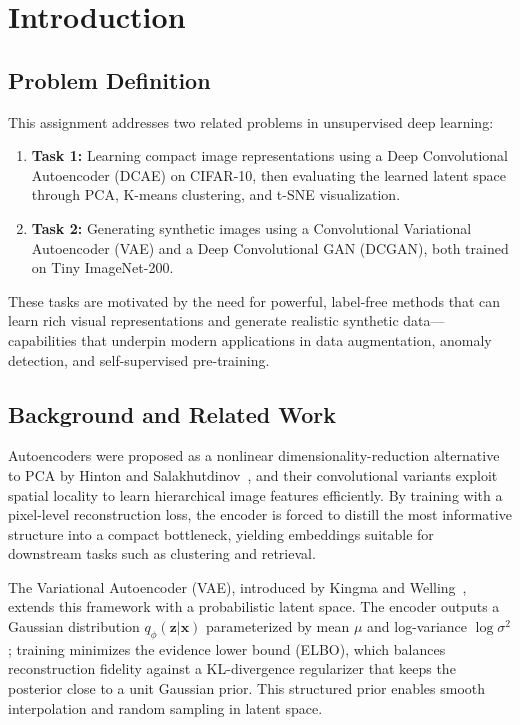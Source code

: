 \documentclass[12pt]{article}
\begin{document}
\section{Introduction}

\subsection{Problem Definition}

This assignment addresses two related problems in unsupervised deep learning:
\begin{enumerate}
    \item \textbf{Task 1:} Learning compact image representations using a Deep Convolutional Autoencoder (DCAE) on CIFAR-10, then evaluating the learned latent space through PCA, K-means clustering, and t-SNE visualization.
    \item \textbf{Task 2:} Generating synthetic images using a Convolutional Variational Autoencoder (VAE) and a Deep Convolutional GAN (DCGAN), both trained on Tiny ImageNet-200.
\end{enumerate}

These tasks are motivated by the need for powerful, label-free methods that can learn rich visual representations and generate realistic synthetic data—capabilities that underpin modern applications in data augmentation, anomaly detection, and self-supervised pre-training.

\subsection{Background and Related Work}

Autoencoders were proposed as a nonlinear dimensionality-reduction alternative to PCA by Hinton and Salakhutdinov~\cite{hinton2006}, and their convolutional variants exploit spatial locality to learn hierarchical image features efficiently. By training with a pixel-level reconstruction loss, the encoder is forced to distill the most informative structure into a compact bottleneck, yielding embeddings suitable for downstream tasks such as clustering and retrieval.

The Variational Autoencoder (VAE), introduced by Kingma and Welling~\cite{vae2013}, extends this framework with a probabilistic latent space. The encoder outputs a Gaussian distribution $q_\phi(\mathbf{z}|\mathbf{x})$ parameterized by mean $\mu$ and log-variance $\log\sigma^2$; training minimizes the evidence lower bound (ELBO), which balances reconstruction fidelity against a KL-divergence regularizer that keeps the posterior close to a unit Gaussian prior. This structured prior enables smooth interpolation and random sampling in latent space.
\end{document}
